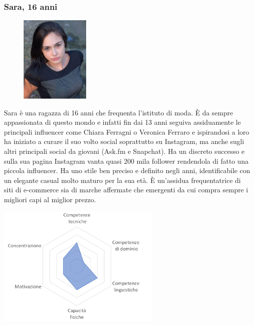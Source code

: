 \documentclass[12pt,a4paper]{report}
\begin{document}
\subsubsection*{Sara, 16 anni}
\begin{figure}
  \centering
  \includegraphics[width=0.3\textwidth]{"Images Latex/Personas/Sara"}
\end{figure}
Sara è una ragazza di 16 anni che frequenta l'istituto di moda. È  da sempre appassionata di questo mondo e infatti fin dai 13 anni seguiva assiduamente le principali influencer come Chiara Ferragni o Veronica Ferraro e ispirandosi a loro ha iniziato a curare il suo volto social soprattutto su Instagram, ma anche sugli altri principali social da giovani (Ask.fm e Snapchat). Ha un discreto successo e sulla sua pagina Instagram vanta quasi 200 mila follower rendendola di fatto una piccola influencer. Ha uno stile ben preciso e definito negli anni, identificabile con un elegante casual molto maturo per la sua età. È un'assidua frequentatrice di siti di e-commerce sia di marche affermate che emergenti da cui compra sempre i migliori capi al miglior prezzo.
\begin{center}
  \includegraphics[width=0.6\textwidth]{"Images Latex/Personas/Sara16"}
\end{center}
\newpage
\end{document}
